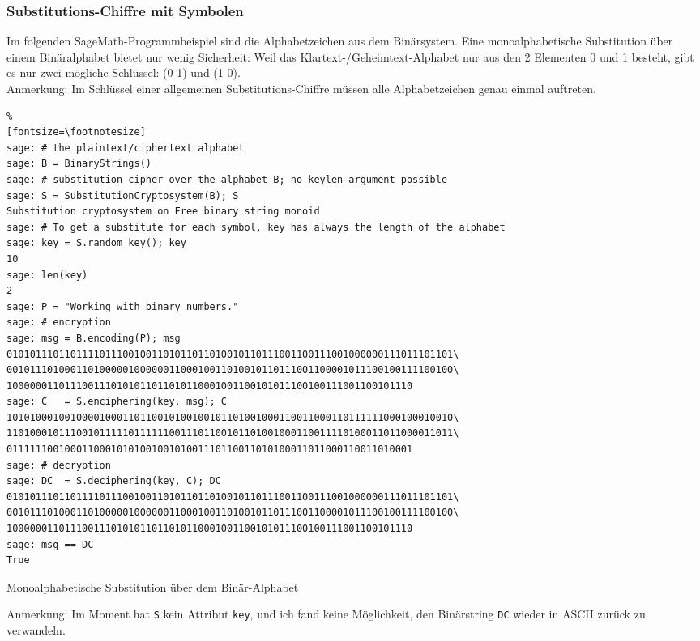 \begin{refsegment}
\newpage
\subsubsection{Substitutions-Chiffre mit Symbolen}

Im folgenden SageMath-Programmbeispiel sind die Alphabetzeichen aus dem Binärsystem.
Eine monoalphabetische Substitution über einem Binäralphabet bietet nur wenig
Sicherheit: Weil das Klartext-/Geheimtext-Alphabet nur aus den 2 Elementen
0 und 1 besteht, gibt es nur zwei mögliche Schlüssel: (0 1) und (1 0). \\
Anmerkung: Im Schlüssel einer allgemeinen Substitutions-Chiffre müssen
alle Alphabetzeichen genau einmal auftreten.

\begin{sagecode}
\begin{Verbatim}%
[fontsize=\footnotesize]
sage: # the plaintext/ciphertext alphabet
sage: B = BinaryStrings()
sage: # substitution cipher over the alphabet B; no keylen argument possible
sage: S = SubstitutionCryptosystem(B); S
Substitution cryptosystem on Free binary string monoid
sage: # To get a substitute for each symbol, key has always the length of the alphabet
sage: key = S.random_key(); key
10
sage: len(key)
2
sage: P = "Working with binary numbers."
sage: # encryption
sage: msg = B.encoding(P); msg
01010111011011110111001001101011011010010110111001100111001000000111011101101\
00101110100011010000010000001100010011010010110111001100001011100100111100100\
1000000110111001110101011011010110001001100101011100100111001100101110
sage: C   = S.enciphering(key, msg); C
10101000100100001000110110010100100101101001000110011000110111111000100010010\
11010001011100101111101111110011101100101101001000110011110100011011000011011\
0111111001000110001010100100101001110110011010100011011000110011010001
sage: # decryption
sage: DC  = S.deciphering(key, C); DC
01010111011011110111001001101011011010010110111001100111001000000111011101101\
00101110100011010000010000001100010011010010110111001100001011100100111100100\
1000000110111001110101011011010110001001100101011100100111001100101110
sage: msg == DC
True
\end{Verbatim}
\caption{Monoalphabetische Substitution über dem Binär-Alphabet}
\end{sagecode}

Anmerkung: Im Moment hat \verb!S! kein Attribut \verb!key!, und ich fand
keine Möglichkeit, den Binärstring \verb!DC! wieder in ASCII zurück zu verwandeln.



\end{refsegment}
